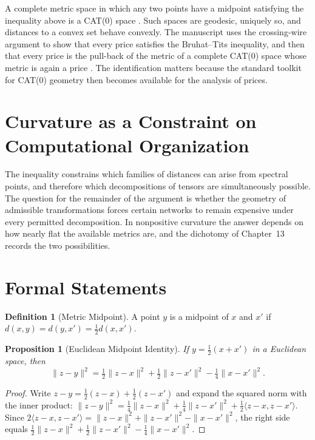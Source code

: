 \documentclass[11pt,letterpaper]{report}
\theoremstyle{plain}
\newtheorem{proposition}[theorem]{Proposition}
\theoremstyle{definition}
\newtheorem{definition}[theorem]{Definition}
\theoremstyle{remark}
\begin{document}
A complete metric space in which any two points have a midpoint satisfying the inequality above is a CAT(0) space \cite{BridsonHaefliger1999}. Such spaces are geodesic, uniquely so, and distances to a convex set behave convexly. The manuscript uses the crossing-wire argument to show that every price satisfies the Bruhat--Tits inequality, and then that every price is the pull-back of the metric of a complete CAT(0) space whose metric is again a price \cite{Source2026}. The identification matters because the standard toolkit for CAT(0) geometry then becomes available for the analysis of prices.

\section{Curvature as a Constraint on Computational Organization}

The inequality constrains which families of distances can arise from spectral points, and therefore which decompositions of tensors are simultaneously possible. The question for the remainder of the argument is whether the geometry of admissible transformations forces certain networks to remain expensive under every permitted decomposition. In nonpositive curvature the answer depends on how nearly flat the available metrics are, and the dichotomy of Chapter~13 records the two possibilities.

\section{Formal Statements}

\begin{definition}[Metric Midpoint]
A point $y$ is a midpoint of $x$ and $x'$ if $d(x,y)=d(y,x')=\tfrac12d(x,x')$.
\end{definition}

\begin{proposition}[Euclidean Midpoint Identity]
If $y=\tfrac12(x+x')$ in a Euclidean space, then
\[
\|z-y\|^2=\tfrac12\|z-x\|^2+\tfrac12\|z-x'\|^2-\tfrac14\|x-x'\|^2.
\]
\end{proposition}
\begin{proof}
Write $z-y=\tfrac12(z-x)+\tfrac12(z-x')$ and expand the squared norm with the inner product: $\|z-y\|^2=\tfrac14\|z-x\|^2+\tfrac14\|z-x'\|^2+\tfrac12\langle z-x,z-x'\rangle$. Since $2\langle z-x,z-x'\rangle=\|z-x\|^2+\|z-x'\|^2-\|x-x'\|^2$, the right side equals $\tfrac12\|z-x\|^2+\tfrac12\|z-x'\|^2-\tfrac14\|x-x'\|^2$.
\end{proof}
\end{document}
